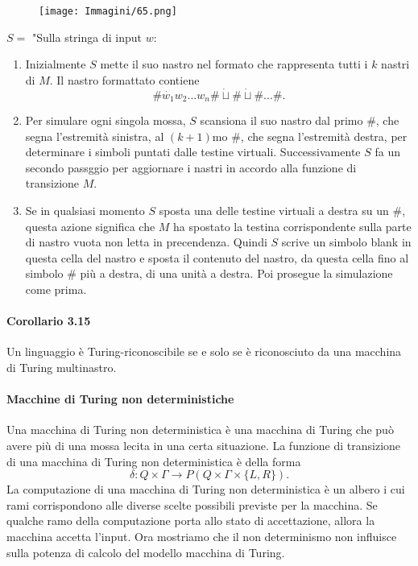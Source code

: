 \documentclass{article}
\begin{document}
\begin{figure}[H]
    \centering
    \texttt{[image: Immagini/65.png]}
    \label{fig:turing_machine_example2}
\end{figure}

$S = $ "Sulla stringa di input $w$:
\begin{enumerate}
    \item Inizialmente $S$ mette il suo nastro nel formato che rappresenta tutti i $k$ nastri di $M$. Il nastro formattato contiene $$\#\dot{w_{1}}w_2...w_n\#\dot{\sqcup}\#\dot{\sqcup}\#...\#.$$
    \item Per simulare ogni singola mossa, $S$ scansiona il suo nastro dal primo $\#$, che segna l'estremità sinistra, al $(k+1)$mo $\#$, che segna l'estremità destra, per determinare i simboli puntati dalle testine virtuali. Successivamente $S$ fa un secondo passggio per aggiornare i nastri in accordo alla funzione di transizione $M$.
    \item Se in qualsiasi momento $S$ sposta una delle testine virtuali a destra su un $\#$, questa azione significa che $M$ ha spostato la testina corrispondente sulla parte di nastro vuota non letta in precendenza. Quindi $S$ scrive un simbolo blank in questa cella del nastro e sposta il contenuto del nastro, da questa cella fino al simbolo $\#$ più a destra, di una unità a destra. Poi prosegue la simulazione come prima.
\end{enumerate}

\paragraph{Corollario 3.15}
\label{cor:da MdT multitape a single tape}
\text{ }

\begin{tcolorbox}[colback=blue!10!white, colframe=blue!50!black, title=Corollario 3.15]
    Un linguaggio è Turing-riconoscibile se e solo se è riconosciuto da una macchina di Turing multinastro.
\end{tcolorbox}

\paragraph{Macchine di Turing non deterministiche}
\label{def:non_deterministic_turing_machine}
\text{ }

Una macchina di Turing non deterministica è una macchina di Turing che può avere più di una mossa lecita in una certa situazione.
La funzione di transizione di una macchina di Turing non deterministica è della forma
$$
\delta: Q \times \Gamma \rightarrow P(Q \times \Gamma \times \{L,R\}).
$$
La computazione di una macchina di Turing non deterministica è un albero i cui rami corrispondono alle diverse scelte possibili previste per la macchina.
Se qualche ramo della computazione porta allo stato di accettazione, allora la macchina accetta l'input.
Ora mostriamo che il non determinismo non influisce sulla potenza di calcolo del modello macchina di Turing.
\end{document}
